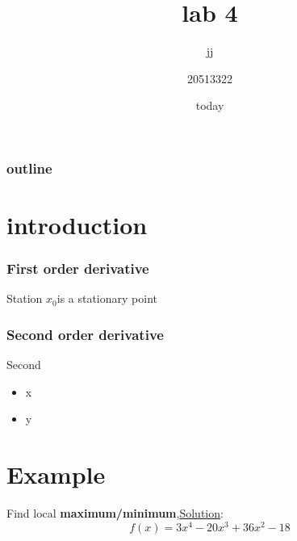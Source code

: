 \documentclass{beamer}
\title{lab 4}
\subtitle{jj}
\author{20513322}
\date{today}
\begin{document}
\begin{frame}
\maketitle
\end{frame}
\frametitle{outline}
\begin{frame}
\tableofcontents
\end{frame}
\section{introduction}
\begin{frame}
\frametitle{First order derivative}
\begin{block}{Station}
$x_0$is a stationary point
\end{block}
\end{frame}
\begin{frame}
\frametitle{Second order derivative}
\begin{block}{Second}
\begin{itemize}
\item x
\item y
\end{itemize}
\end{block}
\end{frame}
\section{Example}
\begin{frame}
Find local \textbf{maximum/minimum},\underline{Solution}:
\begin{equation}
f(x)=3x^4-20x^3+36x^2-18
\end{equation}
\end{frame}
\end{document}
